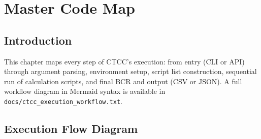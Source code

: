 \documentclass[ctcc_full_documentation.tex]{subfiles}
\begin{document}
\chapter{Master Code Map}

\section{Introduction}

This chapter maps every step of CTCC's execution: from entry (CLI or API) through argument parsing, environment setup, script list construction, sequential run of calculation scripts, and final BCR and output (CSV or JSON). A full workflow diagram in Mermaid syntax is available in \texttt{docs/ctcc\_execution\_workflow.txt}.

\section{Execution Flow Diagram}
\end{document}
